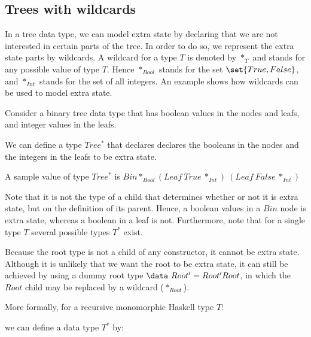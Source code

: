 \fromHere

\subsection{Trees with wildcards}
In a tree data type, we can model extra state by declaring that we are not interested in certain parts of the tree. In order to do so, we represent the extra state parts by wildcards. A wildcard for a type $T$ is denoted by $*_T$ and stands for any possible value of type $T$. Hence $*_{Bool}$ stands for the set $\set{True, False}$, and $*_{Int}$ stands for the set of all integers. An example shows how wildcards can be used to model extra state.

Consider a binary tree data type that has boolean values in the nodes and leafs, and integer values in the leafs.


We can define a type $Tree^*$ that declares declares the booleans in the nodes and the integers in the leafs to be extra state.


A sample value of type $Tree^*$ is $Bin *_{Bool} (Leaf~True~*_{Int})~(Leaf~False~*_{Int})$ 


Note that it is not the type of a child that determines whether or not it is extra state, but on the definition of its parent. Hence, a boolean values in a $Bin$ node is extra state, whereas a boolean in a leaf is not. Furthermore, note that for a single type $T$ several possible types $T^*$ exist.

Because the root type is not a child of any constructor, it cannot be extra state. Although it is unlikely that we want the root to be extra state, it can still be achieved by using a dummy root type $\data~Root' = Root' Root$, in which the $Root$ child may be replaced by a wildcard ($*_{Root}$).  

More formally, for a recursive monomorphic Haskell type $T$:


we can define a data type $T^*$ by:

